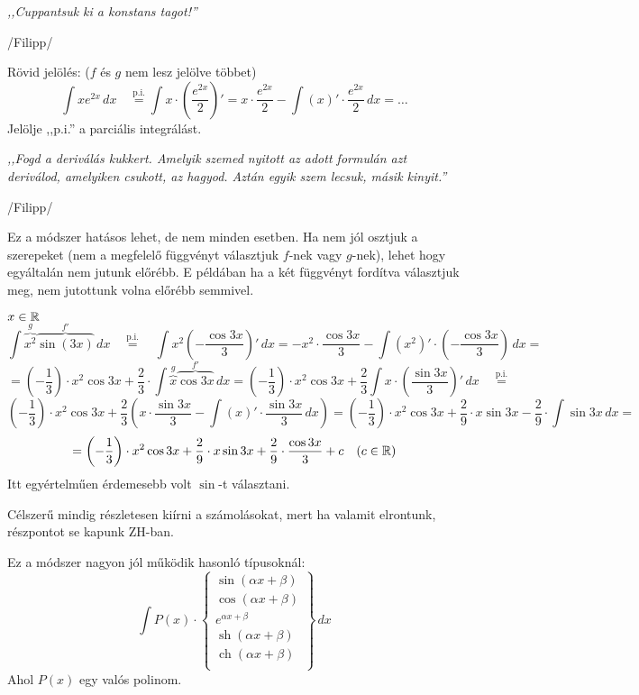 \documentclass[a4paper,11.5pt]{article}
\DeclareMathOperator{\sh}{sh}
\DeclareMathOperator{\ch}{ch}
\begin{document}
	\begin{center}
		\textit{,,Cuppantsuk ki a konstans tagot!''}
		\smallskip
		
		/Filipp/
	\end{center}
	
	\begin{note}
		Rövid jelölés: ($f$ és $g$ nem lesz jelölve többet)
		\[ \int xe^{2x}\,dx\quad \overset{\text{p.i.}}{=}\int x\cdot\left( \frac{e^{2x}}{2}\right)'=x\cdot\frac{e^{2x}}{2}-\int(x)'\cdot\frac{e^{2x}}{2}\,dx=\ldots \]
		Jelölje ,,p.i.'' a parciális integrálást.
	\end{note}
	\begin{center}
		\textit{,,Fogd a deriválás kukkert. Amelyik szemed nyitott az adott formulán azt deriválod, amelyiken csukott, az hagyod. Aztán egyik szem lecsuk, másik kinyit.''}
		
		\smallskip
		/Filipp/
	\end{center}
	\begin{note}
		Ez a módszer hatásos lehet, de nem minden esetben. Ha nem jól osztjuk a szerepeket (nem a megfelelő függvényt választjuk $f$-nek vagy $g$-nek), lehet hogy egyáltalán nem jutunk előrébb. E példában ha a két függvényt fordítva választjuk meg, nem jutottunk volna előrébb semmivel.
	\end{note}
	\begin{task}$x\in\mathbb{R}$
		\[ \int \overbrace{x^2}^{g}\overbrace{\sin(3x)}^{f'}\,dx \quad \overset{\text{p.i.}}{=}\quad  \int x^2\left(-\frac{\cos3x}{3}\right)'\,dx=-x^2\cdot\frac{\cos3x}{3}-\int\left(x^2\right)'\cdot\left(-\frac{\cos3x}{3}\right)\,dx=\]
		\[=\left(-\frac{1}{3}\right)\cdot x^2\cos3x+\frac{2}{3}\cdot\int \overbrace{x}^{g}\overbrace{\cos3x}^{f'}\,dx=\left(-\frac{1}{3}\right)\cdot x^2\cos3x+\frac{2}{3}\int x\cdot\left( \frac{\sin3x}{3}\right)'\,dx\quad \overset{\text{p.i.}}{=} \]
		\[  \left(-\frac{1}{3}\right)\cdot x^2\cos3x+\frac{2}{3}\left(x\cdot\frac{\sin3x}{3}-\int(x)'\cdot\frac{\sin3x}{3}\,dx\right)=\left(-\frac{1}{3}\right)\cdot x^2\cos3x+\frac{2}{9}\cdot x\sin3x-\frac{2}{9}\cdot\int\sin3x\,dx=\]
		\[=\left(-\frac{1}{3}\right) \cdot x^2\cos3x+\frac{2}{9}\cdot
		x\sin3x+\frac{2}{9}\cdot\frac{\cos3x}{3} + c\quad (c\in\mathbb{R}) \]
		Itt egyértelműen érdemesebb volt $\sin$-t választani.
	\end{task}
	\begin{note}
		Célszerű mindig részletesen kiírni a számolásokat, mert ha valamit elrontunk, részpontot se kapunk ZH-ban.
	\end{note}
	\begin{note}
		Ez a módszer nagyon jól működik hasonló típusoknál:
		\[ \int P(x)\cdot
		\left.\begin{cases}
			\sin(\alpha x+\beta)\\
			\cos(\alpha x+\beta)\\
			e^{\alpha x+\beta}\\
			\sh(\alpha x+\beta)\\
			\ch(\alpha x+\beta)\\
		\end{cases}\right\}\,dx \]
		Ahol $P(x)$ egy valós polinom.
	\end{note}
\end{document}
